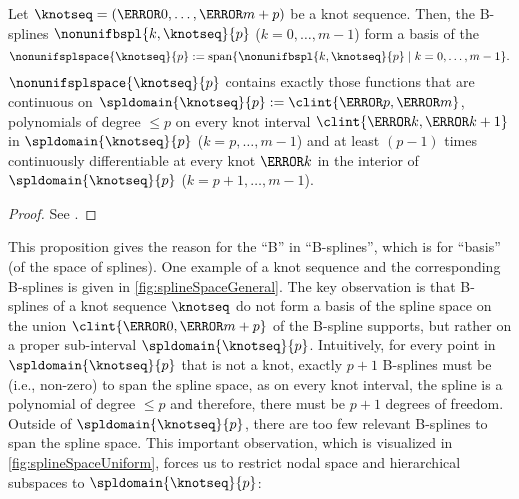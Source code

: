 \begin{proposition}
  \label{prop:splineSpace}
  Let $\knotseq = (\knot{0}, \dotsc, \knot{m+p})$ be a knot sequence.
  Then, the B-splines $\nonunifbspl{k,\knotseq}{p}$ ($k = 0, \dotsc, m - 1$)
  form a basis of the 
  \begin{equation}
    \nonunifsplspace{\knotseq}{p}
    := \spn\{\nonunifbspl{k,\knotseq}{p} \mid k = 0, \dotsc, m - 1\}.
  \end{equation}
  $\nonunifsplspace{\knotseq}{p}$ contains exactly those functions that are continuous
  on $\spldomain{\knotseq}{p} := \clint{\knot{p}, \knot{m}}$,
  polynomials of degree $\le p$ on every knot interval
  $\clint{\knot{k}, \knot{k+1}}$  in
  $\spldomain{\knotseq}{p}$
  ($k = p, \dotsc, m - 1$) and at least $(p - 1)$ times
  continuously differentiable at every knot $\knot{k}$ in the interior of
  $\spldomain{\knotseq}{p}$ ($k = p + 1, \dotsc, m - 1$).
\end{proposition}

\begin{proof}
  See \cite{Hoellig13Approximation}.
\end{proof}

This proposition gives the reason for the ``B'' in ``B-splines'',
which is for ``basis'' (of the space of splines).
One example of a knot sequence and the corresponding B-splines is
given in \cref{fig:splineSpaceGeneral}.
The key observation is that B-splines of a knot sequence $\knotseq$
do not form a basis of the spline space on the union
$\clint{\knot{0}, \knot{m+p}}$ of the B-spline supports,
but rather on a proper sub-interval $\spldomain{\knotseq}{p}$.
Intuitively, for every point in $\spldomain{\knotseq}{p}$ that is not a knot,
exactly $p + 1$ B-splines must be  (i.e., non-zero)
to span the spline space,
as on every knot interval, the spline is a polynomial of degree $\le p$
and therefore, there must be $p + 1$ degrees of freedom.
Outside of $\spldomain{\knotseq}{p}$, there are too few relevant B-splines
to span the spline space.
This important observation,
which is visualized in \cref{fig:splineSpaceUniform},
forces us to restrict nodal space and hierarchical subspaces to
$\spldomain{\knotseq}{p}$:

